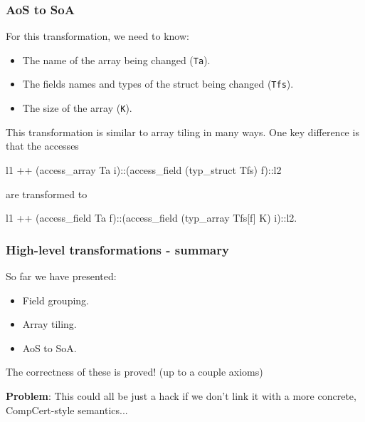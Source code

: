 \begin{frame}[fragile]
\frametitle{AoS to SoA}

For this transformation, we need to know:
\begin{itemize}
	\item The name of the array being changed (\texttt{Ta}).
	\item The fields names and types of the struct being changed (\texttt{Tfs}).
	\item The size of the array (\texttt{K}).
\end{itemize}
 
\bigskip \pause
 
This transformation is similar to array tiling in many ways. One key difference is that the accesses
 
\begin{coqs}
  l1 ++ (access_array Ta i)::(access_field (typ_struct Tfs) f)::l2
\end{coqs}

are transformed to

\begin{coqs}
  l1 ++ (access_field Ta f)::(access_field (typ_array Tfs[f] K) i)::l2.
\end{coqs}
 
\end{frame}


\begin{frame}[fragile]
\frametitle{High-level transformations - summary}

So far we have presented:

\begin{itemize}
	\setlength\itemsep{1.5em}
	\item Field grouping.
	\item Array tiling.
	\item AoS to SoA.
\end{itemize}

\bigskip \pause

The correctness of these is proved! \pause (up to a couple axioms)

\bigskip \pause

\textbf{Problem}: This could all be just a hack if we don't link it with a more concrete, CompCert-style semantics...

\end{frame}



